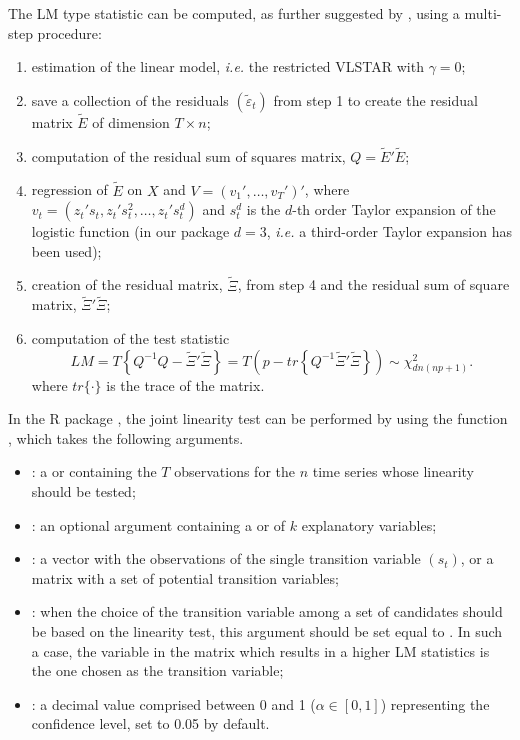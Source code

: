 The LM type statistic can be computed, as further suggested by \citet*{teraya14b}, using a multi-step procedure:
\begin{enumerate}
	\item estimation of the linear model, \textit{i.e.} the restricted VLSTAR with $\gamma = 0$;
	\item save a collection of the residuals $(\tilde{\varepsilon}_t)$ from step 1 to create the residual matrix $\tilde{E}$ of dimension $T \times n$;
	\item computation of the residual sum of squares matrix, $Q = \tilde{E}'\tilde{E}$;
	\item regression of $\tilde{E}$ on $X$ and $V = \left(v_1', \ldots, v_T'\right)'$, where $v_t = \left(z_t's_t, z_t's_t^2, \ldots,  z_t's_t^d\right)$ and $s_t^d$ is the $d$-th order Taylor expansion of the logistic function (in our package $d = 3$, \textit{i.e.} a third-order Taylor expansion has been used);
	\item creation of the residual matrix, $\tilde{\Xi}$, from step 4 and the residual sum of square matrix, $\tilde{\Xi}'\tilde{\Xi}$;
	\item computation of the test statistic
	\begin{equation}\label{eq:LM2}
		LM = T \left\{Q^{-1}Q-\tilde{\Xi}'\tilde{\Xi}\right\} = T\left(p - tr\left\{Q^{-1}\tilde{\Xi}'\tilde{\Xi}\right\}\right) \sim \chi^2_{d n(np+1)}.
	\end{equation}
where $tr\{\cdot\}$ is the trace of the matrix.
\end{enumerate}

In the R package , the joint linearity test can be performed by using the function , which takes the following arguments.
\begin{itemize}
	\item {}: a  or  containing the $T$ observations for the $n$ time series whose linearity should be tested;
	\item {}: an optional argument containing a  or  of $k$ explanatory variables;
	\item {}: a vector with the observations of the single transition variable $\left(s_t\right)$, or a matrix with a set of potential transition variables;
	\item {}: when the choice of the transition variable among a set of candidates should be based on the linearity test, this argument should be set equal to . In such a case, the variable in the matrix  which results in a higher LM statistics is the one chosen as the transition variable;
	\item {}: a decimal value comprised between 0 and 1 ($\alpha \in [0,1]$) representing the confidence level, set to 0.05 by default.
\end{itemize}

